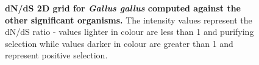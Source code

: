 \documentclass{article}
\begin{document}
\begin{figure}[H]
\centering
{}
\caption{\textbf{dN/dS 2D grid for \textit{Gallus gallus} computed against the other significant organisms.} The intensity values represent the dN/dS ratio - values lighter in colour are less than 1 and purifying selection while values darker in colour are greater than 1 and represent positive selection.}
\label{sup_fig_26}
\end{figure}
\end{document}
